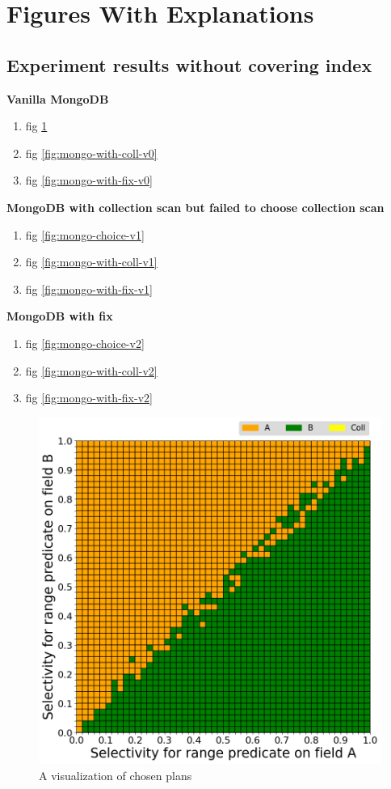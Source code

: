 
\clearpage

\section{Figures With Explanations}

\subsection{Experiment results without covering index}


\noindent\textbf{Vanilla MongoDB}
\begin{enumerate}
    \item fig \ref{fig:mongo-choice-v0}
    \item fig \ref{fig:mongo-with-coll-v0}
    \item fig \ref{fig:mongo-with-fix-v0}
\end{enumerate}

\noindent\textbf{MongoDB with collection scan but failed to choose collection scan}
\begin{enumerate}
    \item fig \ref{fig:mongo-choice-v1}
    \item fig \ref{fig:mongo-with-coll-v1}
    \item fig \ref{fig:mongo-with-fix-v1}
\end{enumerate}


\noindent\textbf{MongoDB with fix}
\begin{enumerate}
    \item fig \ref{fig:mongo-choice-v2}
    \item fig \ref{fig:mongo-with-coll-v2}
    \item fig \ref{fig:mongo-with-fix-v2}
\end{enumerate}



\begin{figure}[htb]
    \centering
    \includegraphics[width=0.6\linewidth]{images/results-without-covering-index/mongo-original/comprehensive_mongo_choice.png}
    \caption{A visualization of chosen plans}
    \label{fig:mongo-choice-v0}
\end{figure}

